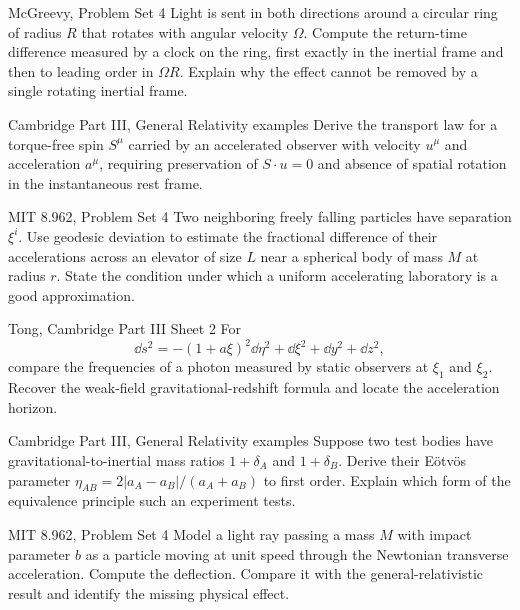 \begin{exercise}{McGreevy, Problem Set 4}
Light is sent in both directions around a circular ring of radius \(R\) that
rotates with angular velocity \(\Omega\).  Compute the return-time difference
measured by a clock on the ring, first exactly in the inertial frame and then
to leading order in \(\Omega R\).  Explain why the effect cannot be removed by
a single rotating inertial frame.
\end{exercise}

\begin{exercise}{Cambridge Part III, General Relativity examples}
Derive the transport law for a torque-free spin \(S^\mu\) carried by an
accelerated observer with velocity \(u^\mu\) and acceleration \(a^\mu\),
requiring preservation of \(S\cdot u=0\) and absence of spatial rotation in
the instantaneous rest frame.
\end{exercise}

\begin{exercise}{MIT 8.962, Problem Set 4}
Two neighboring freely falling particles have separation \(\xi^i\).  Use
geodesic deviation to estimate the fractional difference of their
accelerations across an elevator of size \(L\) near a spherical body of mass
\(M\) at radius \(r\).  State the condition under which a uniform
accelerating laboratory is a good approximation.
\end{exercise}

\begin{exercise}{Tong, Cambridge Part III Sheet 2}
For
\[
\dd s^2=-(1+a\xi)^2\dd\eta^2+\dd\xi^2+\dd y^2+\dd z^2,
\]
compare the frequencies of a photon measured by static observers at
\(\xi_1\) and \(\xi_2\).  Recover the weak-field gravitational-redshift
formula and locate the acceleration horizon.
\end{exercise}

\begin{exercise}{Cambridge Part III, General Relativity examples}
Suppose two test bodies have gravitational-to-inertial mass ratios
\(1+\delta_A\) and \(1+\delta_B\).  Derive their E\"otv\"os parameter
\(\eta_{AB}=2|a_A-a_B|/(a_A+a_B)\) to first order.  Explain which form of the
equivalence principle such an experiment tests.
\end{exercise}

\begin{exercise}{MIT 8.962, Problem Set 4}
Model a light ray passing a mass \(M\) with impact parameter \(b\) as a
particle moving at unit speed through the Newtonian transverse acceleration.
Compute the deflection.  Compare it with the general-relativistic result and
identify the missing physical effect.
\end{exercise}


